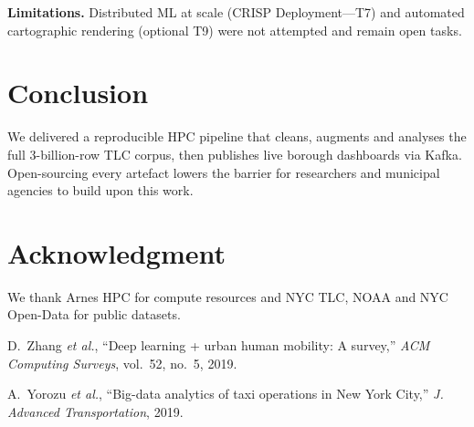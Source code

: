\documentclass[conference]{IEEEtran}
\begin{document}
  \textbf{Limitations.}
  Distributed ML at scale (CRISP Deployment—T7) and automated
  cartographic rendering (optional T9) were not attempted and remain open
  tasks.

  \section{Conclusion}\label{sec:conclusion}
  We delivered a reproducible HPC pipeline that cleans, augments and
  analyses the full 3-billion-row TLC corpus, then publishes live borough
  dashboards via Kafka.  Open-sourcing every artefact lowers the barrier
  for researchers and municipal agencies to build upon this work.

  \section*{Acknowledgment}
  We thank Arnes HPC for compute resources and NYC TLC, NOAA and NYC Open-Data
  for public datasets.

  
  \begin{thebibliography}{00}

    D.~Zhang \emph{et al.}, “Deep learning + urban human mobility: A survey,”
    \emph{ACM Computing Surveys}, vol.~52, no.~5, 2019.

    A.~Yorozu \emph{et al.}, “Big-data analytics of taxi operations in New York
    City,” \emph{J. Advanced Transportation}, 2019.


  \end{thebibliography}

  
\end{document}
